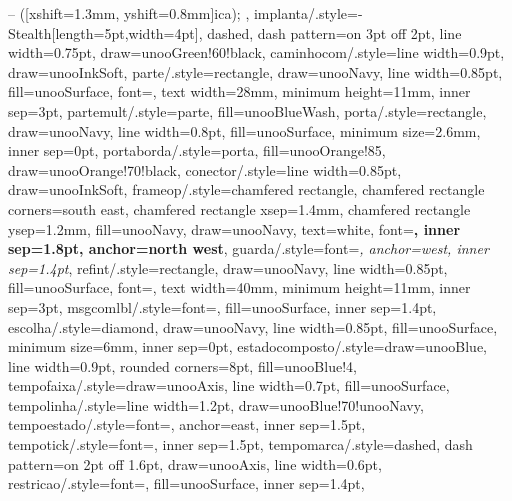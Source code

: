 {{{        -- ([xshift=1.3mm, yshift=0.8mm]ica);
    }},
  implanta/.style={-{Stealth[length=5pt,width=4pt]}, dashed,
    dash pattern=on 3pt off 2pt, line width=0.75pt, draw=unooGreen!60!black},
  caminhocom/.style={line width=0.9pt, draw=unooInkSoft},
  parte/.style={rectangle, draw=unooNavy, line width=0.85pt, fill=unooSurface,
    font=\scriptsize, text width=28mm, minimum height=11mm, inner sep=3pt},
  partemult/.style={parte, fill=unooBlueWash},
  porta/.style={rectangle, draw=unooNavy, line width=0.8pt, fill=unooSurface,
    minimum size=2.6mm, inner sep=0pt},
  portaborda/.style={porta, fill=unooOrange!85, draw=unooOrange!70!black},
  conector/.style={line width=0.85pt, draw=unooInkSoft},
  frameop/.style={chamfered rectangle, chamfered rectangle corners=south east,
    chamfered rectangle xsep=1.4mm, chamfered rectangle ysep=1.2mm,
    fill=unooNavy, draw=unooNavy, text=white, font=\scriptsize\bfseries,
    inner sep=1.8pt, anchor=north west},
  guarda/.style={font=\scriptsize\itshape\color{unooInkSoft}, anchor=west,
    inner sep=1.4pt},
  refint/.style={rectangle, draw=unooNavy, line width=0.85pt, fill=unooSurface,
    font=\scriptsize, text width=40mm, minimum height=11mm, inner sep=3pt},
  msgcomlbl/.style={font=\scriptsize\color{unooInk}, fill=unooSurface,
    inner sep=1.4pt},
  escolha/.style={diamond, draw=unooNavy, line width=0.85pt, fill=unooSurface,
    minimum size=6mm, inner sep=0pt},
  estadocomposto/.style={draw=unooBlue, line width=0.9pt, rounded corners=8pt,
    fill=unooBlue!4},
  tempofaixa/.style={draw=unooAxis, line width=0.7pt, fill=unooSurface},
  tempolinha/.style={line width=1.2pt, draw=unooBlue!70!unooNavy},
  tempoestado/.style={font=\scriptsize\color{unooInkSoft}, anchor=east,
    inner sep=1.5pt},
  tempotick/.style={font=\scriptsize\color{unooMuted}, inner sep=1.5pt},
  tempomarca/.style={dashed, dash pattern=on 2pt off 1.6pt, draw=unooAxis,
    line width=0.6pt},
  restricao/.style={font=\scriptsize\color{unooNavy}, fill=unooSurface,
    inner sep=1.4pt},
}

\newcommand{\ctitulo}[2]{\textcolor{white}{{\scriptsize\estereo{#1}}\\[-0.5pt]\textbf{#2}}}

